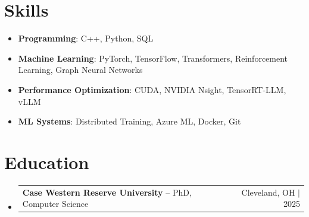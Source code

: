 \documentclass[letterpaper,13pt]{article}
\makeatletter
\newcommand{\resumeProjectHeading}[2]{
    \item
    \begin{tabular*}{\textwidth}{l@{\extracolsep{\fill}}r}
      \small#1 & #2 \\
    \end{tabular*}\vspace{-4pt}
}
\newcommand{\resumeSubHeadingListStart}{\begin{itemize}[leftmargin=0in, label={}]}
\newcommand{\resumeSubHeadingListEnd}{\end{itemize}}
\makeatother
\begin{document}
\section{Skills}
\vspace{0.02cm}
\begin{itemize}[leftmargin=0.15in, label={}, itemsep=2pt, topsep=1pt]
  \item \textbf{Programming}: C++, Python, SQL
  \item \textbf{Machine Learning}: PyTorch, TensorFlow, Transformers, Reinforcement Learning, Graph Neural Networks
  \item \textbf{Performance Optimization}: CUDA, NVIDIA Nsight, TensorRT-LLM, vLLM
  \item \textbf{ML Systems}: Distributed Training, Azure ML, Docker, Git
\end{itemize}
\vspace{0.02cm}

\section{Education}
\resumeSubHeadingListStart
  \resumeProjectHeading{\textbf{Case Western Reserve University} -- PhD, Computer Science}{Cleveland, OH $|$ 2025}
\resumeSubHeadingListEnd
\end{document}

